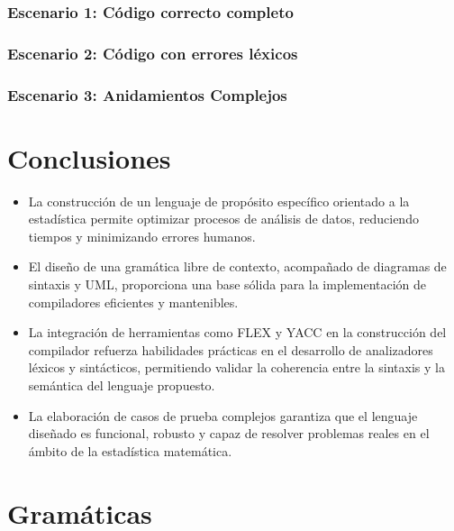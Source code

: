 \documentclass{article}
\begin{document}
\subsubsection{Escenario 1: Código correcto completo}



\subsubsection{Escenario 2: Código con errores léxicos}


\subsubsection{Escenario 3:  Anidamientos Complejos }



\section{Conclusiones}

\begin{itemize}
    \item La construcción de un lenguaje de propósito específico orientado a la estadística permite optimizar procesos de análisis de datos, reduciendo tiempos y minimizando errores humanos.
    
    \item El diseño de una gramática libre de contexto, acompañado de diagramas de sintaxis y UML, proporciona una base sólida para la implementación de compiladores eficientes y mantenibles.
    
    \item La integración de herramientas como FLEX y YACC en la construcción del compilador refuerza habilidades prácticas en el desarrollo de analizadores léxicos y sintácticos, permitiendo validar la coherencia entre la sintaxis y la semántica del lenguaje propuesto.
    
    \item La elaboración de casos de prueba complejos garantiza que el lenguaje diseñado es funcional, robusto y capaz de resolver problemas reales en el ámbito de la estadística matemática.
\end{itemize}


\section{Gramáticas}\label{sec:grammar}
\end{document}
